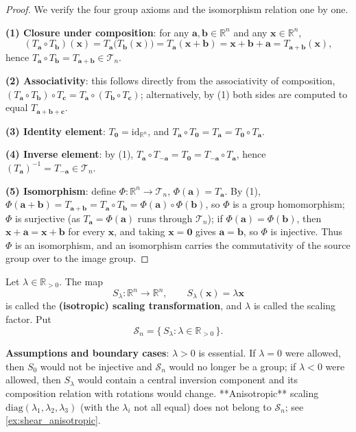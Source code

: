 \begin{proof}
We verify the four group axioms and the isomorphism relation one by one.

\textbf{(1) Closure under composition}: for any $\mathbf{a}, \mathbf{b} \in \mathbb{R}^n$ and any $\mathbf{x} \in \mathbb{R}^n$,
\[
(T_{\mathbf{a}} \circ T_{\mathbf{b}})(\mathbf{x})
= T_{\mathbf{a}}\bigl(T_{\mathbf{b}}(\mathbf{x})\bigr)
= T_{\mathbf{a}}(\mathbf{x} + \mathbf{b})
= \mathbf{x} + \mathbf{b} + \mathbf{a}
= T_{\mathbf{a}+\mathbf{b}}(\mathbf{x}),
\]
hence $T_{\mathbf{a}} \circ T_{\mathbf{b}} = T_{\mathbf{a}+\mathbf{b}} \in \mathcal{T}_n$.

\textbf{(2) Associativity}: this follows directly from the associativity of composition,
$(T_{\mathbf a}\circ T_{\mathbf b})\circ T_{\mathbf c}=T_{\mathbf a}\circ(T_{\mathbf b}\circ T_{\mathbf c})$;
alternatively, by (1) both sides are computed to equal $T_{\mathbf a+\mathbf b+\mathbf c}$.

\textbf{(3) Identity element}: $T_{\mathbf{0}} = \mathrm{id}_{\mathbb R^n}$, and $T_{\mathbf a}\circ T_{\mathbf 0}=T_{\mathbf a}=T_{\mathbf 0}\circ T_{\mathbf a}$.

\textbf{(4) Inverse element}: by (1), $T_{\mathbf{a}} \circ T_{-\mathbf{a}} = T_{\mathbf{0}} = T_{-\mathbf{a}} \circ T_{\mathbf{a}}$, hence $(T_{\mathbf a})^{-1} = T_{-\mathbf a} \in \mathcal T_n$.

\textbf{(5) Isomorphism}: define $\Phi: \mathbb{R}^n \to \mathcal{T}_n$, $\Phi(\mathbf{a}) = T_{\mathbf{a}}$. By (1), $\Phi(\mathbf{a}+\mathbf{b}) = T_{\mathbf{a}+\mathbf{b}} = T_{\mathbf{a}} \circ T_{\mathbf{b}} = \Phi(\mathbf{a}) \circ \Phi(\mathbf{b})$, so $\Phi$ is a group homomorphism; $\Phi$ is surjective (as $T_{\mathbf a}=\Phi(\mathbf a)$ runs through $\mathcal T_n$); if $\Phi(\mathbf{a}) = \Phi(\mathbf{b})$, then $\mathbf x+\mathbf a=\mathbf x+\mathbf b$ for every $\mathbf x$, and taking $\mathbf x=\mathbf 0$ gives $\mathbf a=\mathbf b$, so $\Phi$ is injective. Thus $\Phi$ is an isomorphism, and an isomorphism carries the commutativity of the source group over to the image group.
\end{proof}

\begin{definition}\label{def:scaling_map}
Let $\lambda \in \mathbb{R}_{>0}$. The map
\[
S_{\lambda}: \mathbb{R}^n \to \mathbb{R}^n, \qquad S_{\lambda}(\mathbf{x}) = \lambda \mathbf{x}
\]
is called the \textbf{(isotropic) scaling transformation}, and $\lambda$ is called the scaling factor. Put
\[
\mathcal{S}_n = \{\, S_{\lambda} : \lambda \in \mathbb{R}_{>0} \,\}.
\]

\textbf{Assumptions and boundary cases}: $\lambda > 0$ is essential. If $\lambda = 0$ were allowed, then $S_0$ would not be injective and $\mathcal S_n$ would no longer be a group; if $\lambda < 0$ were allowed, then $S_\lambda$ would contain a central inversion component and its composition relation with rotations would change. **Anisotropic** scaling $\mathrm{diag}(\lambda_1,\lambda_2,\lambda_3)$ (with the $\lambda_i$ not all equal) does not belong to $\mathcal S_n$; see \cref{ex:shear_anisotropic}.
\end{definition}

